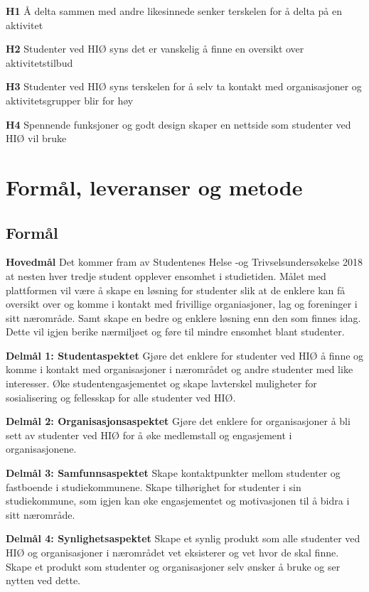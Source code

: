 \begin{compactitem}
\item[{\bf H1}] Å delta sammen med andre likesinnede senker terskelen for å delta på en aktivitet
\item[{\bf H2}] Studenter ved HIØ syns det er vanskelig å finne en oversikt over aktivitetstilbud
\item[{\bf H3}] Studenter ved HIØ syns terskelen for å selv ta kontakt med organisasjoner og aktivitetsgrupper blir for høy 
\item[{\bf H4}] Spennende funksjoner og godt design skaper en nettside som studenter ved HIØ vil bruke
\end{compactitem}

\section{Formål, leveranser og metode}
\label{sec:maal-metode-resultater}

\subsection{Formål}

\begin{compactitem}
\item [{\bf Hovedmål}] Det kommer fram av Studentenes Helse -og Trivselsundersøkelse 2018 at nesten hver tredje student opplever ensomhet i studietiden. \cite{SHOT:2} Målet med plattformen vil være å skape en løsning for studenter slik at de enklere kan få oversikt over og komme i kontakt med frivillige organiasjoner, lag og foreninger i sitt nærområde. Samt skape en bedre og enklere løsning enn den som finnes idag. Dette vil igjen berike nærmiljøet og føre til mindre ensomhet blant studenter.
\begin{compactitem}
\item [{\bf  Delmål 1: Studentaspektet} ] Gjøre det enklere for studenter ved HIØ å finne og komme i kontakt med organisasjoner i nærområdet og andre studenter med like interesser. Øke studentengasjementet og skape lavterskel muligheter for sosialisering og fellesskap for alle studenter ved HIØ.
\item [{\bf  Delmål 2: Organisasjonsaspektet} ] Gjøre det enklere for organisasjoner å bli sett av studenter ved HIØ for å øke medlemstall og engasjement i organisasjonene.
\item [{\bf  Delmål 3: Samfunnsaspektet} ] Skape kontaktpunkter mellom studenter og fastboende i studiekommunene. Skape tilhørighet for studenter i sin studiekommune, som igjen kan øke engasjementet og motivasjonen til å bidra i sitt nærområde.
\item [{\bf  Delmål 4: Synlighetsaspektet} ] Skape et synlig produkt som alle studenter ved HIØ og organisasjoner i nærområdet vet eksisterer og vet hvor de skal finne. Skape et produkt som studenter og organisasjoner selv ønsker å bruke og ser nytten ved dette.
\end{compactitem} 
\end{compactitem}

